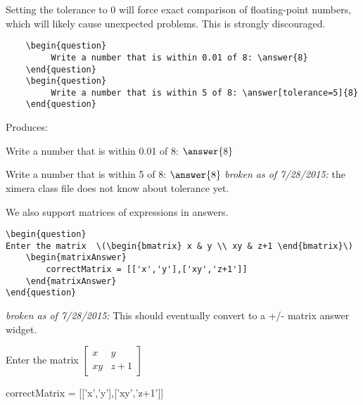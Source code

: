 \documentclass{ximera}
\begin{document}
\begin{warning}
Setting the tolerance to 0 will force exact comparison of floating-point numbers, which will likely cause unexpected problems. This is strongly discouraged. 
\end{warning}

\begin{verbatim}
    \begin{question}
         Write a number that is within 0.01 of 8: \answer{8}
    \end{question}
    \begin{question}
         Write a number that is within 5 of 8: \answer[tolerance=5]{8}
    \end{question}
\end{verbatim}

Produces:

\begin{question}
     Write a number that is within 0.01 of 8: $\answer{8}$
\end{question}
\begin{question}
     Write a number that is within 5 of 8: $\answer{8}$  \emph{broken as of 7/28/2015:} the ximera class file does not know about tolerance yet.
\end{question}

We also support matrices of expressions in answers.

\begin{verbatim}
\begin{question}
Enter the matrix  \(\begin{bmatrix} x & y \\ xy & z+1 \end{bmatrix}\)
    \begin{matrixAnswer}
	    correctMatrix = [['x','y'],['xy','z+1']]
    \end{matrixAnswer}
\end{question}
\end{verbatim}

\emph{broken as of 7/28/2015:} This should eventually convert to a +/- matrix answer widget.

\begin{question}
  Enter the matrix  \(\begin{bmatrix} x & y \\ xy & z+1 \end{bmatrix}\)
\begin{matrixAnswer}
    correctMatrix = [['x','y'],['xy','z+1']]
\end{matrixAnswer}
\end{question}
\end{document}
